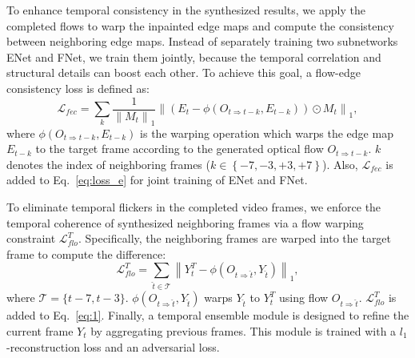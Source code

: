 To enhance temporal consistency in the synthesized results, we apply the completed flows to warp the inpainted edge maps and compute the consistency between neighboring edge maps. 
%
Instead of separately training two subnetworks ENet and FNet, we train them jointly, because the temporal correlation and structural details can boost each other. 
To achieve this goal, a flow-edge consistency loss is defined as:
%
\begin{equation}
	\label{eq:flow_edge}
	\mathcal{L}_{fec}=\sum_{k}\frac{1}{\left\|M_{t} \right\|_1}\left\|(E_{t}-\phi(O_{t\Rightarrow t-k},E_{t-k}))\odot M_{t}\right\|_1,
\end{equation}
where $\phi(O_{t\Rightarrow t-k},E_{t-k})$ is the warping operation which warps the edge map $E_{t-k}$ to the target frame according to the generated optical flow $O_{t\Rightarrow t-k}$.
$k$ denotes the index of neighboring frames ($k\in \left\{-7,-3,+3,+7 \right\}$). Also, $\mathcal{L}_{fec}$ is added to Eq.~\eqref{eq:loss_e} for joint training of ENet and FNet.


To eliminate temporal flickers in the completed video frames, we enforce the temporal coherence of synthesized neighboring frames via a flow warping constraint $\mathcal{L}^T_{flo}$. 
%
Specifically, the neighboring frames are warped into the target frame to compute the difference: 
\begin{equation}
\label{eq:inp_flow}
\mathcal{L}^T_{flo}=\sum_{\widehat{t}\in\mathcal{T}}\left\| Y^T_t-\phi(O_{t\Rightarrow \widehat{t}},Y_{\widehat{t}}) \right\|_1,
\end{equation}
where $\mathcal{T}=\{t-7,t-3\}$. $\phi(O_{t\Rightarrow \widehat{t}},Y_{\widehat{t}})$ warps $Y_{\widehat{t}}$ to $Y^T_{t}$ using flow $O_{t\Rightarrow \widehat{t}}$.
%
$\mathcal{L}^T_{flo}$ is added to Eq.~\eqref{eq:1}.
Finally, a temporal ensemble module is designed 
to refine the current frame $Y_t$ by aggregating previous frames. %
This module is trained with a $l_1$-reconstruction loss and an adversarial loss.








